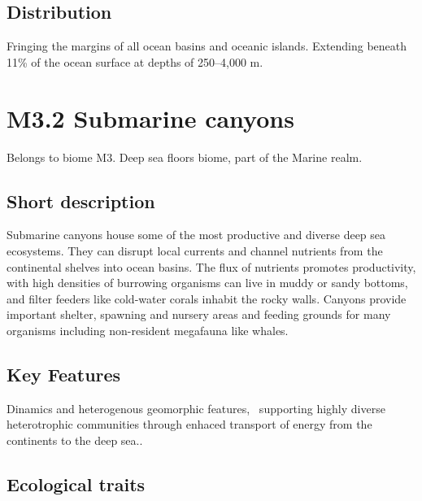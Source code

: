 \documentclass[
  letterpaper,
  DIV=11,
  numbers=noendperiod]{scrartcl}
\begin{document}
\subsection{Distribution}\label{distribution-40}

Fringing the margins of all ocean basins and oceanic islands. Extending
beneath 11\% of the ocean surface at depths of 250--4,000 m.

\section{M3.2 Submarine canyons}\label{m3.2-submarine-canyons}

Belongs to biome M3. Deep sea floors biome, part of the Marine realm.

\subsection{Short description}\label{short-description-41}

Submarine canyons house some of the most productive and diverse deep sea
ecosystems. They can disrupt local currents and channel nutrients from
the continental shelves into ocean basins. The flux of nutrients
promotes productivity, with high densities of burrowing organisms can
live in muddy or sandy bottoms, and filter feeders like cold-water
corals inhabit the rocky walls. Canyons provide important shelter,
spawning and nursery areas and feeding grounds for many organisms
including non-resident megafauna like whales.

\subsection{Key Features}\label{key-features-41}

Dinamics and heterogenous geomorphic features,~ supporting highly
diverse heterotrophic communities through enhaced transport of energy
from the continents to the deep sea..

\subsection{Ecological traits}\label{ecological-traits-41}
\end{document}
